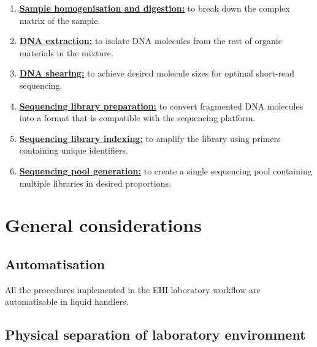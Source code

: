 \documentclass[
]{book}
\providecommand{\tightlist}{%
  \setlength{\itemsep}{0pt}\setlength{\parskip}{0pt}}
\begin{document}
\begin{enumerate}
\def\labelenumi{\arabic{enumi}.}
\tightlist
\item
  \protect\hyperlink{sample-digestion}{\textbf{Sample homogenisation and digestion:}} to break down the complex matrix of the sample.
\item
  \protect\hyperlink{dna-extraction}{\textbf{DNA extraction:}} to isolate DNA molecules from the rest of organic materials in the mixture.
\item
  \protect\hyperlink{dna-shearing}{\textbf{DNA shearing:}} to achieve desired molecule sizes for optimal short-read sequencing.
\item
  \protect\hyperlink{library-preparation}{\textbf{Sequencing library preparation:}} to convert fragmented DNA molecules into a format that is compatible with the sequencing platform.
\item
  \protect\hyperlink{library-indexing}{\textbf{Sequencing library indexing:}} to amplify the library using primers containing unique identifiers.
\item
  \protect\hyperlink{library-pooling}{\textbf{Sequencing pool generation:}} to create a single sequencing pool containing multiple libraries in desired proportions.
\end{enumerate}

\hypertarget{general-considerations}{%
\section{General considerations}\label{general-considerations}}

\hypertarget{automatisation}{%
\subsection*{Automatisation}\label{automatisation}}

All the procedures implemented in the EHI laboratory workflow are automatisable in liquid handlers.

\hypertarget{physical-separation-of-laboratory-environment}{%
\subsection*{Physical separation of laboratory environment}\label{physical-separation-of-laboratory-environment}}
\end{document}
